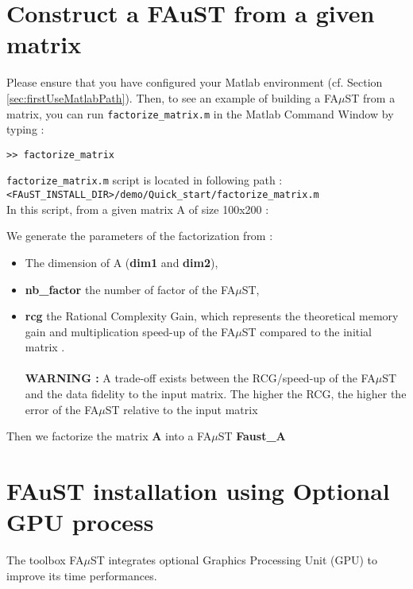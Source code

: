 \section{Construct a FAuST from a given matrix}\label{sec:WorkingProgressBuildFromMatrix}
Please ensure that you have configured your Matlab environment (cf. Section \ref{sec:firstUseMatlabPath}). Then, to see an example of building a FA$\mu$ST from a matrix, you can run \texttt{factorize\_matrix.m} in the Matlab Command Window by typing :
\lstset{style=customMatlab}
\begin{lstlisting}
>> factorize_matrix
\end{lstlisting}
\texttt{factorize\_matrix.m} script is located in following path :\\
\texttt{<FAuST\_INSTALL\_DIR>/demo/Quick\_start/factorize\_matrix.m} \\

In this script, from a given matrix A of size 100x200 :

We generate the parameters of the factorization from :
\begin{itemize}
\item The dimension of A (\textbf{dim1} and \textbf{dim2}),
\item \textbf{nb\_factor} the number of factor of the FA$\mu$ST,
\item \textbf{rcg} the Rational Complexity Gain, which represents the theoretical memory gain and multiplication speed-up of the FA$\mu$ST compared to the initial matrix .
\\ \\\textbf{WARNING :}  A trade-off exists between the RCG/speed-up of the FA$\mu$ST and the data fidelity to the input matrix.
The higher the RCG, the higher the error of the FA$\mu$ST relative to the input matrix
\end{itemize}

\lstset{style=customBash}

Then we factorize the matrix \textbf{A} into a FA$\mu$ST \textbf{Faust\_A}



\section{FAuST installation using Optional GPU process}\label{sec:OptionalGPU}
The toolbox FA$\mu$ST integrates optional Graphics Processing Unit (GPU) to improve its time performances.
